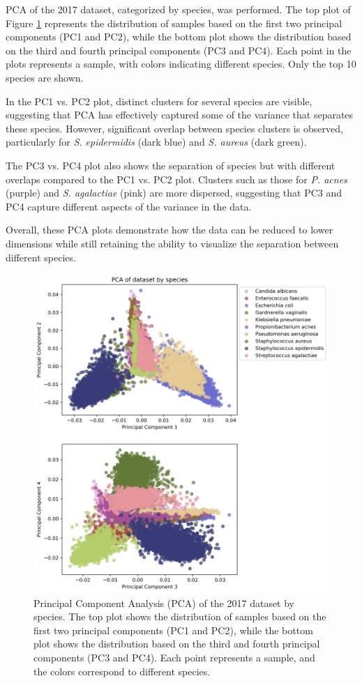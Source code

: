 \documentclass[english,11pt,a4paper,titlepage]{article}
\begin{document}
PCA of the 2017 dataset, categorized by species, was performed. The top plot of Figure \ref{fig:species_pca} represents the distribution of samples based on the first two principal components (PC1 and PC2), while the bottom plot shows the distribution based on the third and fourth principal components (PC3 and PC4). Each point in the plots represents a sample, with colors indicating different species. Only the top 10 species are shown.

In the PC1 vs. PC2 plot, distinct clusters for several species are visible, suggesting that PCA has effectively captured some of the variance that separates these species. However, significant overlap between species clusters is observed, particularly for \textit{S. epidermidis} (dark blue) and \textit{S. aureus} (dark green).

The PC3 vs. PC4 plot also shows the separation of species but with different overlaps compared to the PC1 vs. PC2 plot. Clusters such as those for \textit{P. acnes} (purple) and \textit{S. agalactiae} (pink) are more dispersed, suggesting that PC3 and PC4 capture different aspects of the variance in the data.

Overall, these PCA plots demonstrate how the data can be reduced to lower dimensions while still retaining the ability to visualize the separation between different species.

\begin{figure}[h!]
	\centering
	\includegraphics[width=0.9\linewidth]{img/PCA_combined.png}
	\caption{Principal Component Analysis (PCA) of the 2017 dataset by species. The top plot shows the distribution of samples based on the first two principal components (PC1 and PC2), while the bottom plot shows the distribution based on the third and fourth principal components (PC3 and PC4). Each point represents a sample, and the colors correspond to different species.}
	\label{fig:species_pca}
\end{figure}
\end{document}
